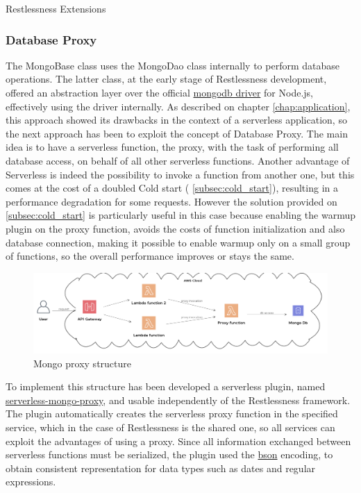 \begin{chapter}{Restlessness Extensions}
    \subsubsection{Database Proxy}
    \label{subsec:database_proxy}
    The MongoBase class uses the MongoDao class internally to perform database
    operations. The latter class, at the early stage of Restlessness development,
    offered an abstraction layer over the official
    \href{https://www.npmjs.com/package/mongodb}{mongodb driver} for Node.js,
    effectively using the driver internally.
    As described on chapter \ref{chap:application}, this approach showed its
    drawbacks in the context of a serverless application, so the next approach has
    been to exploit the concept of Database Proxy.
    The main idea is to have a serverless function, the proxy, with the task of
    performing all database access, on behalf of all other serverless functions.
    Another advantage of Serverless is indeed the possibility to invoke a function
    from another one, but this comes at the cost of a doubled Cold start (
    \ref{subsec:cold_start}), resulting in a performance degradation for some requests.
    However the solution provided on \ref{subsec:cold_start} is particularly useful in
    this case because enabling the warmup plugin on the proxy function, avoids the
    costs of function initialization and also database connection, making it possible
    to enable warmup only on a small group of functions, so the overall performance
    improves or stays the same.

    \begin{figure}
        \centering
        \includegraphics[width=\linewidth]{source/diagrams/mongo_proxy.png}
        \caption{Mongo proxy structure}
    \end{figure}

    To implement this structure has been developed a serverless plugin, named
    \href{https://www.npmjs.com/package/serverless-mongo-proxy}{serverless-mongo-proxy},
    and usable independently of the Restlessness framework.
    The plugin automatically creates the serverless proxy function in the specified
    service, which in the case of Restlessness is the shared one, so all services
    can exploit the advantages of using a proxy.
    Since all information exchanged between serverless functions must be serialized,
    the plugin used the \href{http://bsonspec.org/}{bson} encoding, to obtain consistent
    representation for data types such as dates and regular expressions.


\end{chapter}
